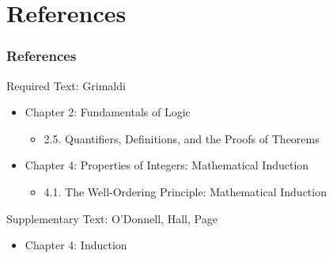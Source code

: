 \documentclass[dvipsnames]{beamer}
\begin{document}
\section*{References}

\begin{frame}
  \frametitle{References}

  \begin{block}{Required Text: Grimaldi}
    \begin{itemize}
      \item Chapter 2: Fundamentals of Logic
      \begin{itemize}
        \item 2.5. \alert{Quantifiers, Definitions, and the Proofs of Theorems}
      \end{itemize}

      \item Chapter 4: Properties of Integers: Mathematical Induction
      \begin{itemize}
        \item 4.1. \alert{The Well-Ordering Principle: Mathematical Induction}
      \end{itemize}
    \end{itemize}
  \end{block}

  \begin{block}{Supplementary Text: O'Donnell, Hall, Page}
    \begin{itemize}
      \item Chapter 4: Induction
    \end{itemize}
  \end{block}
\end{frame}
\end{document}
